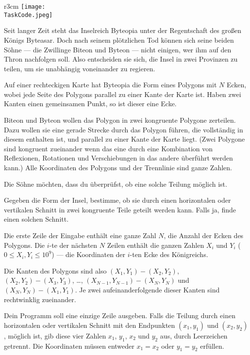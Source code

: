 \documentclass{boi2014-de}
\renewcommand{\TaskCode}{demarcation}
\begin{document}
    \begin{wrapfigure}{r}{3cm}
        \vspace{-24pt}
		\texttt{[image: \\TaskCode.jpeg]}
	\end{wrapfigure}
    
    Seit langer Zeit steht das Inselreich Byteopia unter der Regentschaft des großen Königs Byteasar.
    Doch nach seinem plötzlichen Tod können sich seine beiden Söhne --- die Zwillinge Biteon und Byteon --- nicht einigen, wer ihm auf den Thron nachfolgen soll.
    Also entscheiden sie sich, die Insel in zwei Provinzen zu teilen, um sie unabhängig voneinander zu regieren.
 
    Auf einer rechteckigen Karte hat Byteopia die Form eines Polygons mit $N$ Ecken, wobei jede Seite des Polygons parallel zu einer Kante der Karte ist. Haben zwei Kanten einen gemeinsamen Punkt, so ist dieser eine Ecke.
    
    Biteon und Byteon wollen das Polygon in zwei kongruente Polygone zerteilen. Dazu wollen sie eine gerade Strecke durch das Polygon führen, die vollständig in diesem enthalten ist, und parallel zu einer Kante der Karte liegt. (Zwei Polygone sind kongruent zueinander wenn das eine durch eine Kombination von Reflexionen, Rotationen und Verschiebungen in das andere überführt werden kann.)
    Alle Koordinaten des Polygons und der Trennlinie sind ganze Zahlen.
 
    Die Söhne möchten, dass du überprüfst, ob eine solche Teilung möglich ist.

    \Task
    Gegeben die Form der Insel, bestimme, ob sie durch einen horizontalen oder vertikalen Schnitt in zwei kongruente Teile geteilt werden kann.
    Falls ja, finde einen solchen Schnitt.
    
    \Input
    Die erste Zeile der Eingabe enthält eine ganze Zahl $N$, die Anzahl der Ecken des Polygons.
    Die $i$-te der nächsten $N$ Zeilen enthält die ganzen Zahlen $X_i$ und $Y_i$ ($0 \le X_i, Y_i \le 10^9$) --- die Koordinaten der $i$-ten Ecke des Königreichs.
    
    Die Kanten des Polygons sind also $(X_1,Y_1) - (X_2,Y_2)$, $(X_2,Y_2) - (X_3,Y_3)$, \ldots, $(X_{N-1},Y_{N-1}) - (X_N,Y_N)$ und $(X_N,Y_N) - (X_1,Y_1)$.
    Je zwei aufeinanderfolgende dieser Kanten sind rechtwinklig zueinander.

    \Output
    Dein Programm soll eine einzige Zeile ausgeben.
    Falls die Teilung durch einen horizontalen oder vertikalen Schnitt mit den Endpunkten $(x_1, y_1)$ und $(x_2, y_2)$, möglich ist, gib diese vier Zahlen $x_1$, $y_1$, $x_2$ und $y_2$ aus, durch Leerzeichen getrennt. Die Koordinaten müssen entweder $x_1 = x_2$ oder $y_1 = y_2$ erfüllen.
    
\end{document}
